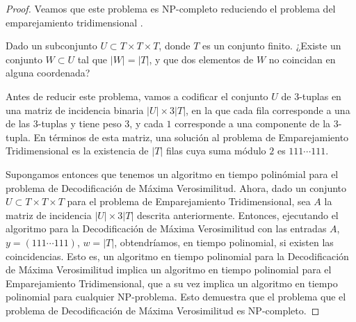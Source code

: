 \begin{proof}
    Veamos que este problema es NP-completo reduciendo el problema del emparejamiento tridimensional \cite{Berlekamp_McEliece_1978}.

    \begin{problemth}
        Dado un subconjunto $U \subset T \times T \times T$, donde $T$ es un conjunto finito. ¿Existe un conjunto $W \subset U$ tal que $\vert W \vert = \vert T \vert$, y que dos elementos de $W$ no coincidan en alguna coordenada?
    \end{problemth}

    Antes de reducir este problema, vamos a codificar el conjunto $U$ de $3$-tuplas en una matriz de incidencia binaria $\vert U \vert \times 3 \vert T \vert$, en la que cada fila corresponde a una de las $3$-tuplas y tiene peso $3$, y cada $1$ corresponde a una componente de la $3$-tupla. En términos de esta matriz, una solución al problema de Emparejamiento Tridimensional es la existencia de $\vert T \vert$ filas cuya suma módulo $2$ es $111\cdots111$.

    Supongamos entonces que tenemos un algoritmo en tiempo polinómial para el problema de Decodificación de Máxima Verosimilitud. Ahora, dado un conjunto $U \subset T \times T \times T$ para el problema de Emparejamiento Tridimensional, sea $A$ la matriz de incidencia $\vert U \vert \times 3 \vert T \vert$ descrita anteriormente. Entonces, ejecutando el algoritmo para la Decodificación de Máxima Verosimilitud con las entradas $A$, $y = (111\cdots111)$, $w = \vert T \vert$, obtendríamos, en tiempo polinomial, si existen las coincidencias. Esto es, un algoritmo en tiempo polinomial para la Decodificación de Máxima Verosimilitud implica un algoritmo en tiempo polinomial para el Emparejamiento Tridimensional, que a su vez implica un algoritmo en tiempo polinomial para cualquier NP-problema. Esto demuestra que el problema que el problema de Decodificación de Máxima Verosimilitud es NP-completo.
\end{proof}

